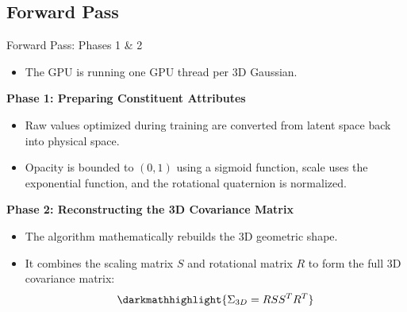 \subsection{Forward Pass}

\begin{frame}{Forward Pass: Phases 1 \& 2}
    \begin{itemize}
        \item The GPU is running one GPU thread per 3D Gaussian.
    \end{itemize}

    \vspace{1em}

    \pause
    \textbf{Phase 1: Preparing Constituent Attributes}
    \begin{itemize}
        \justifying
        \item Raw values optimized during training are converted from latent space back into physical space.
        \item Opacity is bounded to $(0,1)$ using a sigmoid function, scale uses the exponential function, and the rotational quaternion is normalized.
    \end{itemize}
    
    \vspace{1em}
    
    \pause
    \textbf{Phase 2: Reconstructing the 3D Covariance Matrix}
    \begin{itemize}
        \justifying
        \item The algorithm mathematically rebuilds the 3D geometric shape.
        \item It combines the scaling matrix $S$ and rotational matrix $R$ to form the full 3D covariance matrix:
        $$ \darkmathhighlight{\Sigma_{3D} = RSS^{T}R^{T}} $$
    \end{itemize}
\end{frame}

